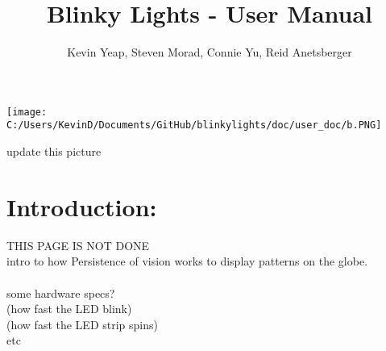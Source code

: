 \documentclass[12pt, a4paper]{ article}
\date{}
\begin{document}
 
\title{Blinky Lights - User Manual} 
\author{Kevin Yeap, Steven Morad, Connie Yu, Reid Anetsberger}
\maketitle 

\iffalse
    This is a block comment.
    This line is also inside the block comment.
\fi



\begin{center}

\texttt{[image: C:/Users/KevinD/Documents/GitHub/blinkylights/doc/user\_doc/b.PNG]}

\end{center}






update this picture
\tableofcontents                       %





\newpage
{}
\section*{Introduction:} 
\vspace{1cm}



THIS PAGE IS NOT DONE\\
intro to how Persistence of vision works to display patterns on the globe.\\\\

some hardware specs?\\
(how fast the LED blink)\\
(how fast the LED strip spins)\\
etc\\
\end{document}
